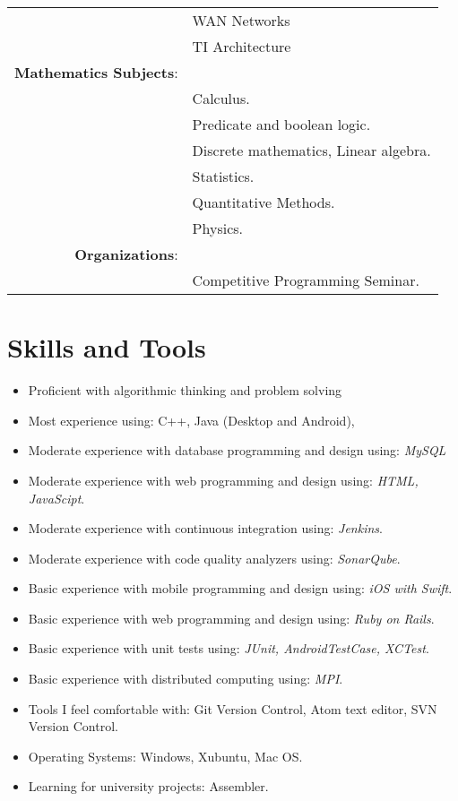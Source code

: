 \documentclass[a4paper,10pt]{article} %
\begin{document}
\begin{tabular}{rl}
&\textbf{}WAN Networks\\
&\textbf{}TI Architecture\\
\textbf{Mathematics Subjects}:\\
&\textbf{}Calculus.\\
&\textbf{}Predicate and boolean logic.\\
&\textbf{}Discrete mathematics, Linear algebra.\\
&\textbf{}Statistics.\\
&\textbf{}Quantitative Methods.\\
&\textbf{}Physics.\\
\textbf{Organizations}:\\
&\textbf{}Competitive Programming Seminar.
\end{tabular}
\newpage


\section{Skills and Tools}
\begin{itemize}
 \item Proficient with algorithmic thinking and problem solving
 \item Most experience using: C++, Java (Desktop and Android),
 \item Moderate experience with database programming and design using: {\sl MySQL}
 \item Moderate experience with web programming and design using: {\sl HTML, JavaScipt}.
 \item Moderate experience with continuous integration using: {\sl Jenkins}.
 \item Moderate experience with code quality analyzers using: {\sl SonarQube}.
 \item Basic experience with mobile programming and design using: {\sl iOS with Swift}.
 \item Basic experience with web programming and design using: {\sl Ruby on Rails}.
 \item Basic experience with unit tests using: {\sl JUnit, AndroidTestCase, XCTest}.
 \item Basic experience with distributed computing using: {\sl MPI}.
 \item Tools I feel comfortable with: Git Version Control, Atom text editor, SVN Version Control.
 \item Operating Systems: Windows, Xubuntu, Mac OS.
 \item Learning for university projects: Assembler.
\end{itemize}
\end{document}
